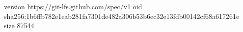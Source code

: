 version https://git-lfs.github.com/spec/v1
oid sha256:1b6ffb782e1eab281fa7301de482a306b53b6ec32e13fdb00142cf68a617261e
size 87544
